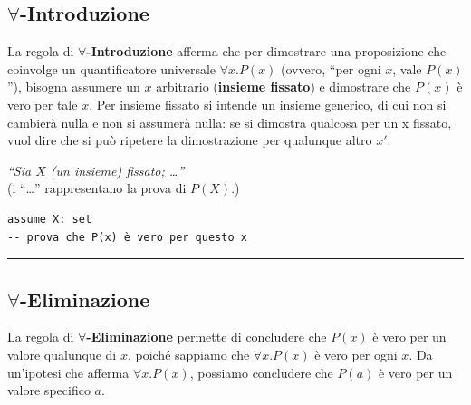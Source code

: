 \documentclass[
  a4paper,
]{article}
\begin{document}
\hypertarget{forall-introduzione}{%
\subsection{\texorpdfstring{\(\forall\)-Introduzione}{\textbackslash forall-Introduzione}}\label{forall-introduzione}}

La regola di \textbf{\(\forall\)-Introduzione} afferma che per
dimostrare una proposizione che coinvolge un quantificatore universale
\(\forall x.P(x)\) (ovvero, ``per ogni \(x\), vale \(P(x)\)''), bisogna
assumere un \(x\) arbitrario (\textbf{insieme fissato}) e dimostrare che
\(P(x)\) è vero per tale \(x\). Per insieme fissato si intende un
insieme generico, di cui non si cambierà nulla e non si assumerà nulla:
se si dimostra qualcosa per un x fissato, vuol dire che si può ripetere
la dimostrazione per qualunque altro \(x'\).

\begin{examplebox}[Esempio]

\emph{``Sia \(X\) (un insieme) fissato; \ldots{}''}\\
(i ``\ldots{}'' rappresentano la prova di \(P(X)\).)

\end{examplebox}

\begin{examplebox}

\begin{lstlisting}
assume X: set
-- prova che P(x) è vero per questo x
\end{lstlisting}

\end{examplebox}

\par\noindent\rule{\linewidth}{0.4pt}\par\vspace{6pt}

\hypertarget{forall-eliminazione}{%
\subsection{\texorpdfstring{\(\forall\)-Eliminazione}{\textbackslash forall-Eliminazione}}\label{forall-eliminazione}}

La regola di \textbf{\(\forall\)-Eliminazione} permette di concludere
che \(P(x)\) è vero per un valore qualunque di \(x\), poiché sappiamo
che \(\forall x.P(x)\) è vero per ogni \(x\). Da un'ipotesi che afferma
\(\forall x.P(x)\), possiamo concludere che \(P(a)\) è vero per un
valore specifico \(a\).
\end{document}
